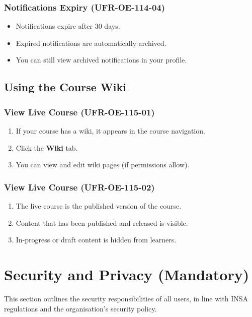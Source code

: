 \subsubsection{Notifications Expiry (UFR-OE-114-04)}
\begin{itemize}
    \item Notifications expire after 30 days.
    \item Expired notifications are automatically archived.
    \item You can still view archived notifications in your profile.
\end{itemize}

\subsection{Using the Course Wiki}

\subsubsection{View Live Course (UFR-OE-115-01)}
\begin{enumerate}
    \item If your course has a wiki, it appears in the course navigation.
    \item Click the \textbf{Wiki} tab.
    \item You can view and edit wiki pages (if permissions allow).
\end{enumerate}

\subsubsection{View Live Course (UFR-OE-115-02)}
\begin{enumerate}
    \item The live course is the published version of the course.
    \item Content that has been published and released is visible.
    \item In-progress or draft content is hidden from learners.
\end{enumerate}

\section{Security and Privacy (Mandatory)}
This section outlines the security responsibilities of all users, in line with INSA regulations and the organisation’s security policy.

